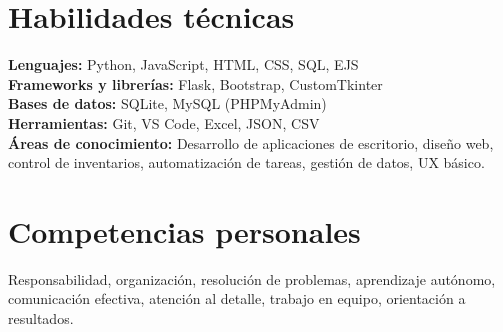 \documentclass[11pt]{article}
\begin{document}
\vspace{6pt}

\section*{Habilidades técnicas}

\textbf{Lenguajes:} Python, JavaScript, HTML, CSS, SQL, EJS \\
\textbf{Frameworks y librerías:} Flask, Bootstrap, CustomTkinter \\
\textbf{Bases de datos:} SQLite, MySQL (PHPMyAdmin) \\
\textbf{Herramientas:} Git, VS Code, Excel, JSON, CSV \\
\textbf{Áreas de conocimiento:} Desarrollo de aplicaciones de escritorio, diseño web, control de inventarios, automatización de tareas, gestión de datos, UX básico.

\vspace{6pt}

\section*{Competencias personales}

Responsabilidad, organización, resolución de problemas, aprendizaje autónomo, comunicación efectiva, atención al detalle, trabajo en equipo, orientación a resultados.
\end{document}

